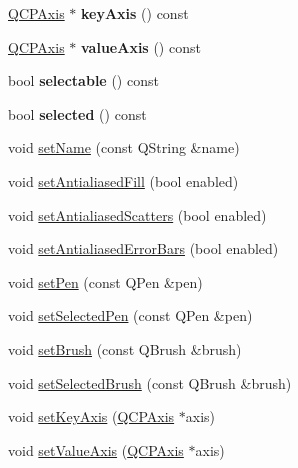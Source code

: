\begin{DoxyCompactItemize}
\mbox{\hyperlink{class_q_c_p_axis}{Q\+C\+P\+Axis}} $\ast$ {\bfseries key\+Axis} () const
\item 
\mbox{\label{class_q_c_p_abstract_plottable_af47809a644a68ffd955fb30b01fb4f2f}} 
\mbox{\hyperlink{class_q_c_p_axis}{Q\+C\+P\+Axis}} $\ast$ {\bfseries value\+Axis} () const
\item 
\mbox{\label{class_q_c_p_abstract_plottable_adf896b8a213fea74440c7bc969cf6e4c}} 
bool {\bfseries selectable} () const
\item 
\mbox{\label{class_q_c_p_abstract_plottable_a0b3b514474fe93354fc74cfc144184b4}} 
bool {\bfseries selected} () const
\item 
void \mbox{\hyperlink{class_q_c_p_abstract_plottable_ab79c7ba76bc7fa89a4b3580e12149f1f}{set\+Name}} (const Q\+String \&name)
\item 
void \mbox{\hyperlink{class_q_c_p_abstract_plottable_a089d6b5577120239b55c39ed27c39536}{set\+Antialiased\+Fill}} (bool enabled)
\item 
void \mbox{\hyperlink{class_q_c_p_abstract_plottable_a2f03f067ede2ed4da6f7d0e4777a3f02}{set\+Antialiased\+Scatters}} (bool enabled)
\item 
void \mbox{\hyperlink{class_q_c_p_abstract_plottable_a757beb744b96cf1855cca5ab9d3ecf52}{set\+Antialiased\+Error\+Bars}} (bool enabled)
\item 
void \mbox{\hyperlink{class_q_c_p_abstract_plottable_ab74b09ae4c0e7e13142fe4b5bf46cac7}{set\+Pen}} (const Q\+Pen \&pen)
\item 
void \mbox{\hyperlink{class_q_c_p_abstract_plottable_a6911603cad23ab0469b108224517516f}{set\+Selected\+Pen}} (const Q\+Pen \&pen)
\item 
void \mbox{\hyperlink{class_q_c_p_abstract_plottable_a7a4b92144dca6453a1f0f210e27edc74}{set\+Brush}} (const Q\+Brush \&brush)
\item 
void \mbox{\hyperlink{class_q_c_p_abstract_plottable_ae8c816874089f7a44001e8618e81a9dc}{set\+Selected\+Brush}} (const Q\+Brush \&brush)
\item 
void \mbox{\hyperlink{class_q_c_p_abstract_plottable_a8524fa2994c63c0913ebd9bb2ffa3920}{set\+Key\+Axis}} (\mbox{\hyperlink{class_q_c_p_axis}{Q\+C\+P\+Axis}} $\ast$axis)
\item 
void \mbox{\hyperlink{class_q_c_p_abstract_plottable_a71626a07367e241ec62ad2c34baf21cb}{set\+Value\+Axis}} (\mbox{\hyperlink{class_q_c_p_axis}{Q\+C\+P\+Axis}} $\ast$axis)

\end{DoxyCompactItemize}

